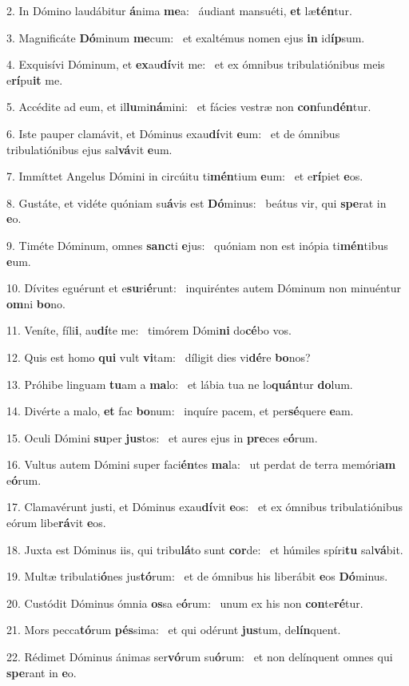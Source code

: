 2. In Dómino laudábitur \textbf{á}nima \textbf{me}a: \ast\  áudiant mansuéti, \textbf{et} læ\textbf{tén}tur.\

3. Magnificáte \textbf{Dó}minum \textbf{me}cum: \ast\  et exaltémus nomen ejus \textbf{in} id\textbf{íp}sum.\

4. Exquisívi Dóminum, et \textbf{ex}au\textbf{dí}vit me: \ast\  et ex ómnibus tribulatiónibus meis e\textbf{rí}pu\textbf{it} me.\

5. Accédite ad eum, et il\textbf{lu}mi\textbf{ná}mini: \ast\  et fácies vestræ non \textbf{con}fun\textbf{dén}tur.\

6. Iste pauper clamávit, et Dóminus exau\textbf{dí}vit \textbf{e}um: \ast\  et de ómnibus tribulatiónibus ejus sal\textbf{vá}vit \textbf{e}um.\

7. Immíttet Angelus Dómini in circúitu ti\textbf{mén}tium \textbf{e}um: \ast\  et e\textbf{rí}piet \textbf{e}os.\

8. Gustáte, et vidéte quóniam su\textbf{á}vis est \textbf{Dó}minus: \ast\  beátus vir, qui \textbf{spe}rat in \textbf{e}o.\

9. Timéte Dóminum, omnes \textbf{sanc}ti \textbf{e}jus: \ast\  quóniam non est inópia ti\textbf{mén}tibus \textbf{e}um.\

10. Dívites eguérunt et e\textbf{su}ri\textbf{é}runt: \ast\  inquiréntes autem Dóminum non minuéntur \textbf{om}ni \textbf{bo}no.\

11. Veníte, fíli\textbf{i}, au\textbf{dí}te me: \ast\  timórem Dómi\textbf{ni} do\textbf{cé}bo vos.\

12. Quis est homo \textbf{qui} vult \textbf{vi}tam: \ast\  díligit dies vi\textbf{dé}re \textbf{bo}nos?\

13. Próhibe linguam \textbf{tu}am a \textbf{ma}lo: \ast\  et lábia tua ne lo\textbf{quán}tur \textbf{do}lum.\

14. Divérte a malo, \textbf{et} fac \textbf{bo}num: \ast\  inquíre pacem, et per\textbf{sé}quere \textbf{e}am.\

15. Oculi Dómini \textbf{su}per \textbf{jus}tos: \ast\  et aures ejus in \textbf{pre}ces e\textbf{ó}rum.\

16. Vultus autem Dómini super faci\textbf{én}tes \textbf{ma}la: \ast\  ut perdat de terra memóri\textbf{am} e\textbf{ó}rum.\

17. Clamavérunt justi, et Dóminus exau\textbf{dí}vit \textbf{e}os: \ast\  et ex ómnibus tribulatiónibus eórum libe\textbf{rá}vit \textbf{e}os.\

18. Juxta est Dóminus iis, qui tribu\textbf{lá}to sunt \textbf{cor}de: \ast\  et húmiles spíri\textbf{tu} sal\textbf{vá}bit.\

19. Multæ tribulati\textbf{ó}nes jus\textbf{tó}rum: \ast\  et de ómnibus his liberábit \textbf{e}os \textbf{Dó}minus.\

20. Custódit Dóminus ómnia \textbf{os}sa e\textbf{ó}rum: \ast\  unum ex his non \textbf{con}te\textbf{ré}tur.\

21. Mors pecca\textbf{tó}rum \textbf{pés}sima: \ast\  et qui odérunt \textbf{jus}tum, de\textbf{lín}quent.\

22. Rédimet Dóminus ánimas ser\textbf{vó}rum su\textbf{ó}rum: \ast\  et non delínquent omnes qui \textbf{spe}rant in \textbf{e}o.\

